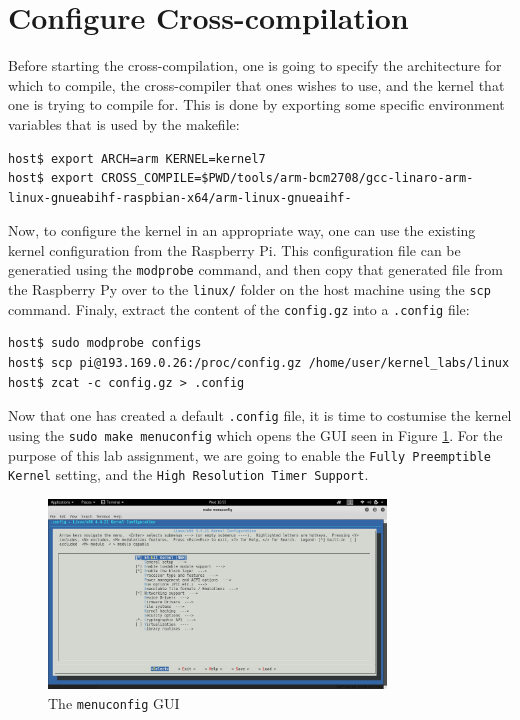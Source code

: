 \documentclass[a4paper,oneside,onecolumn]{article}
\newcommand{\code}[1]{\colorbox{codegray}{\texttt{#1}}}
\begin{document}
\section{Configure Cross-compilation}

Before starting the cross-compilation, one is going to specify the architecture for which to compile, the cross-compiler that ones wishes to use, and the kernel that one is trying to compile for. This is done by exporting some specific environment variables that is used by the makefile:
\begin{lstlisting}
host$ export ARCH=arm KERNEL=kernel7
host$ export CROSS_COMPILE=$PWD/tools/arm-bcm2708/gcc-linaro-arm-linux-gnueabihf-raspbian-x64/arm-linux-gnueaihf-
\end{lstlisting}
Now, to configure the kernel in an appropriate way, one can use the existing kernel configuration from the Raspberry Pi. This configuration file can be generatied using the \code{modprobe} command, and then copy that generated file from the Raspberry Py over to the \texttt{linux/} folder on the host machine using the \code{scp} command. Finaly, extract the content of the \texttt{config.gz} into a \texttt{.config} file:
\begin{lstlisting}
host$ sudo modprobe configs
host$ scp pi@193.169.0.26:/proc/config.gz /home/user/kernel_labs/linux
host$ zcat -c config.gz > .config
\end{lstlisting}
Now that one has created a default \texttt{.config} file, it is time to costumise the kernel using the \code{sudo make menuconfig} which opens the GUI seen in Figure \ref{fig:menuconfig}. For the purpose of this lab assignment, we are going to enable the \texttt{Fully Preemptible Kernel} setting, and the \texttt{High Resolution Timer Support}.
\begin{figure}[!h]
	\centering
	\includegraphics[width=0.8\textwidth,natwidth=610,natheight=642]{Resources/meunconfig.png}
	\caption{The \texttt{menuconfig} GUI}
	\label{fig:menuconfig}
\end{figure}
\end{document}
